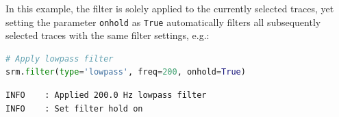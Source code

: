\documentclass[a4paper,fleqn]{cas-sc}
\begin{document}
In this example, the filter is solely applied to the currently selected traces, yet setting the parameter \texttt{onhold} as \texttt{True} automatically filters all subsequently selected traces with the same filter settings, e.g.:
\begin{lstlisting}[language=Python, firstnumber=16]
# Apply lowpass filter
srm.filter(type='lowpass', freq=200, onhold=True)
\end{lstlisting}
\begin{footnotesize}
\begin{verbatim}
INFO    : Applied 200.0 Hz lowpass filter
INFO    : Set filter hold on
\end{verbatim}
\end{footnotesize}
\end{document}
